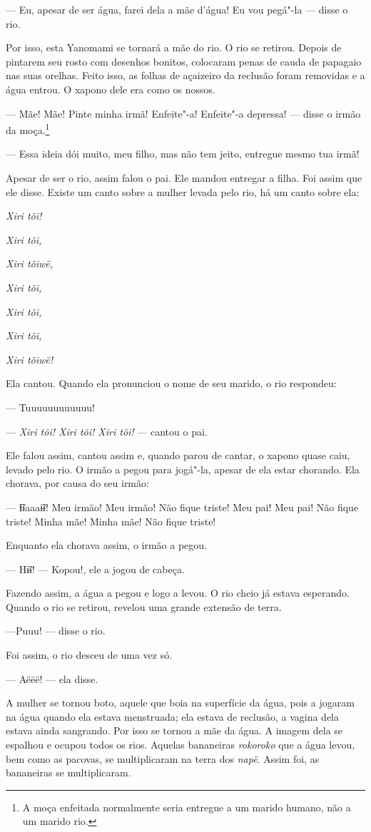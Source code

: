 --- Eu, apesar de ser água, farei dela a mãe d'água! Eu vou pegá"-la ---
disse o rio. 

Por isso, esta Yanomami se tornará a mãe do rio. O rio se retirou.
Depois de pintarem seu rosto com desenhos bonitos, colocaram penas de
cauda de papagaio nas suas orelhas. Feito isso, as folhas de açaizeiro
da reclusão foram removidas e a água entrou. O xapono dele era como os
nossos. 

--- Mãe! Mãe! Pinte minha irmã! Enfeite"-a! Enfeite"-a depressa! --- disse
o irmão da moça.\footnote{  A moça enfeitada normalmente seria entregue a um marido humano, não a um
marido rio.}

--- Essa ideia dói muito, meu filho, mas não tem jeito, entregue mesmo
tua irmã! 

Apesar de ser o rio, assim falou o pai. Ele mandou entregar a filha.
Foi assim que ele disse. Existe um canto sobre a mulher levada pelo rio,
há um canto sobre ela:

\emph{Xiri tõi!} 

\emph{Xiri tõi,} 

\emph{Xiri tõiwë,} 

\emph{Xiri tõi,} 

\emph{Xiri tõi,} 

\emph{Xiri tõi,} 

\emph{Xiri tõiwë!} 

Ela cantou. Quando ela pronunciou o nome de seu marido, o rio
respondeu: 

--- Tuuuuuuuuuuuu!

--- \emph{Xiri tõi! Xiri tõi! Xiri tõi!} --- cantou o pai. 

Ele falou assim, cantou assim e, quando parou de cantar, o xapono quase
caiu, levado pelo rio. O irmão a pegou para jogá"-la, apesar de ela estar
chorando. Ela chorava, por causa do seu irmão: 

--- Ɨ̃ɨaaaɨ̃ɨ! Meu irmão! Meu irmão! Não fique triste! Meu pai! Meu
pai! Não fique triste! Minha mãe! Minha mãe! Não fique triste! 

Enquanto ela chorava assim, o irmão a pegou. 

--- Hɨ̃ɨ! ---  Kopou!, ele a jogou de cabeça. 

Fazendo assim, a água a pegou e logo a levou. O rio cheio já estava
esperando. Quando o rio se retirou, revelou uma grande extensão de
terra. 

---Puuu! --- disse o rio. 

Foi assim, o rio desceu de uma vez só. 

--- Aëëë! --- ela disse. 

A mulher se tornou boto, aquele que boia na superfície da água, pois a
jogaram na água quando ela estava menstruada; ela estava de reclusão, a
vagina dela estava ainda sangrando. Por isso se tornou a mãe da água. A imagem dela se espalhou e ocupou todos os rios. Aquelas
bananeiras \emph{rokoroko} que a água levou, bem como as pacovas, se
multiplicaram na terra dos \emph{napë}. Assim foi, as bananeiras se
multiplicaram. 
